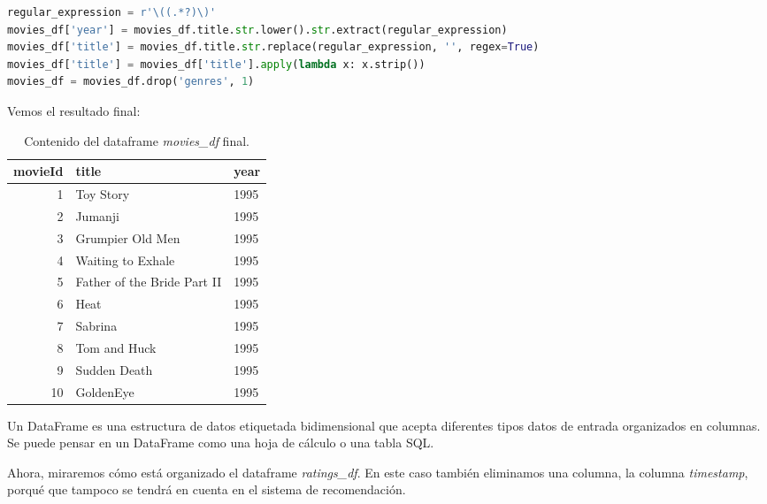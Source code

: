 \documentclass{uimppracticas}
\begin{document}
\begin{lstlisting}[language=python, basicstyle=\small]
regular_expression = r'\((.*?)\)'
movies_df['year'] = movies_df.title.str.lower().str.extract(regular_expression)
movies_df['title'] = movies_df.title.str.replace(regular_expression, '', regex=True)
movies_df['title'] = movies_df['title'].apply(lambda x: x.strip())
movies_df = movies_df.drop('genres', 1)
\end{lstlisting}

Vemos el resultado final:

\begin{table}[H]
	\centering
	\begin{tabular}{rll}
		\toprule
		movieId &                  title &  year \\
		\midrule
		1 &                    Toy Story &  1995 \\
		2 &                      Jumanji &  1995 \\
		3 &             Grumpier Old Men &  1995 \\
		4 &            Waiting to Exhale &  1995 \\
		5 &  Father of the Bride Part II &  1995 \\
		6 &                         Heat &  1995 \\
		7 &                      Sabrina &  1995 \\
		8 &                 Tom and Huck &  1995 \\
		9 &                 Sudden Death &  1995 \\
		10 &                    GoldenEye &  1995 \\
		\bottomrule
	\end{tabular}
	\caption{Contenido del dataframe \textit{movies\_df} final.}
	\label{movies_df_final}
\end{table}

\begin{definition}\label{dataframe}
	Un DataFrame es una estructura de datos etiquetada bidimensional que acepta diferentes tipos datos de entrada organizados en columnas. Se puede pensar en un DataFrame como una hoja de cálculo o una tabla SQL.
\end{definition}

\newpage

Ahora, miraremos cómo está organizado el dataframe \textit{ratings\_df}. En este caso también eliminamos una columna, la columna \textit{timestamp}, porqué que tampoco se tendrá en cuenta en el sistema de recomendación.
\end{document}
